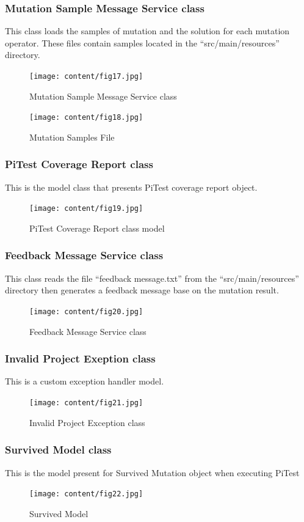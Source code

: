 \subsubsection{Mutation Sample Message Service class}
This class loads the samples of mutation and the solution for each mutation operator. These files contain samples located in the “src/main/resources” directory.
\newpage
\begin{figure}[h!]
	\centering
	\texttt{[image: content/fig17.jpg]}
	\caption{Mutation Sample Message Service class}
	\label{fig:f11}
\end{figure}

\newpage
\begin{figure}[h!]
	\centering
	\texttt{[image: content/fig18.jpg]}
	\caption{Mutation Samples File}
	\label{fig:f11}
\end{figure}
\subsubsection{PiTest Coverage Report class}
This is the model class that presents PiTest coverage report object.
\newpage
\begin{figure}[h!]
	\centering
	\texttt{[image: content/fig19.jpg]}
	\caption{PiTest Coverage Report class model}
	\label{fig:f11}
\end{figure}

\subsubsection{Feedback Message Service class}
This class reads the file “feedback message.txt” from the “src/main/resources” directory then generates a feedback message base on the mutation result.
\newpage
\begin{figure}[h!]
	\centering
	\texttt{[image: content/fig20.jpg]}
	\caption{Feedback Message Service class}
	\label{fig:f11}
\end{figure}
\subsubsection{Invalid Project Exeption class}
This is a custom exception handler model.
\newpage
\begin{figure}[h!]
	\centering
	\texttt{[image: content/fig21.jpg]}
	\caption{Invalid Project Exception class}
	\label{fig:f11}
\end{figure}
\subsubsection{Survived Model class}
This is the model present for Survived Mutation object when executing PiTest
\begin{figure}[h!]
	\centering
	\texttt{[image: content/fig22.jpg]}
	\caption{Survived Model}
	\label{fig:f11}
\end{figure}

